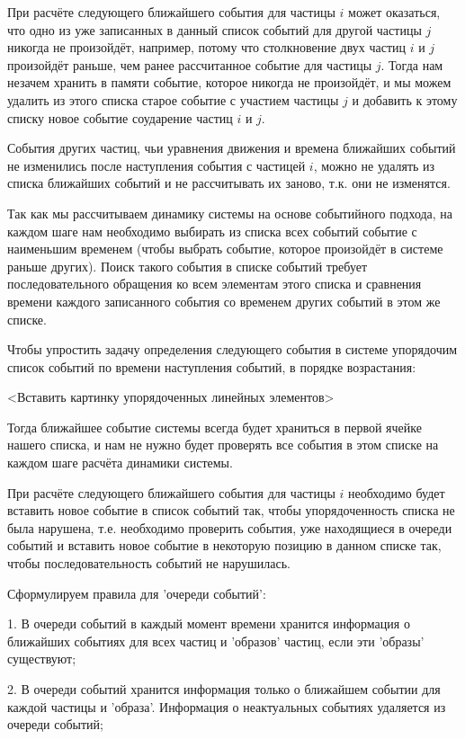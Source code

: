\documentclass[a4paper]{article}
\begin{document}
При расчёте следующего ближайшего события для частицы $ i $ может оказаться, что одно из уже записанных в данный список событий для другой частицы $ j $ никогда не произойдёт, например, потому что столкновение двух частиц $ i $ и $ j $ произойдёт раньше, чем ранее рассчитанное событие для частицы $ j $. Тогда нам незачем хранить в памяти событие, которое никогда не произойдёт, и мы можем удалить из этого списка старое событие с участием частицы $ j $ и добавить к этому списку новое событие соударение частиц $ i $ и $ j $.

События других частиц, чьи уравнения движения и времена ближайших событий не изменились после наступления события с частицей $ i $, можно не удалять из списка ближайших событий и не рассчитывать их заново, т.к. они не изменятся.

Так как мы рассчитываем динамику системы на основе событийного подхода, на каждом шаге нам необходимо выбирать из списка всех событий событие с наименьшим временем (чтобы выбрать событие, которое произойдёт в системе раньше других). Поиск такого события в списке событий требует последовательного обращения ко всем элементам этого списка и сравнения времени каждого записанного события со временем других событий в этом же списке.

Чтобы упростить задачу определения следующего события в системе упорядочим список событий по времени наступления событий, в порядке возрастания:

<Вставить картинку упорядоченных линейных элементов>

Тогда ближайшее событие системы всегда будет храниться в первой ячейке нашего списка, и нам не нужно будет проверять все события в этом списке на каждом шаге расчёта динамики системы.

При расчёте следующего ближайшего события для частицы $ i $ необходимо будет вставить новое событие в список событий так, чтобы упорядоченность списка не была нарушена, т.е. необходимо проверить события, уже находящиеся в очереди событий и вставить новое событие в некоторую позицию в данном списке так, чтобы последовательность событий не нарушилась.

Сформулируем правила для 'очереди событий':

1. В очереди событий в каждый момент времени хранится информация о ближайших событиях для всех частиц и 'образов' частиц, если эти 'образы' существуют;

2. В очереди событий хранится информация только о ближайшем событии для каждой частицы и 'образа'. Информация о неактуальных событиях удаляется из очереди событий;
\end{document}
